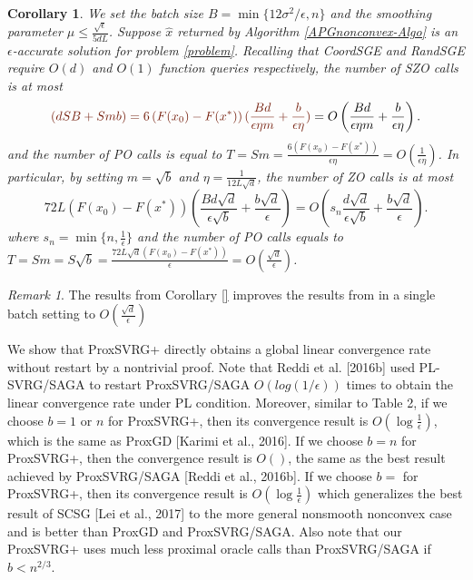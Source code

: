 \documentclass{article}
\newtheorem{corollary}[theorem]{Corollary}
\theoremstyle{definition}
\theoremstyle{remark}
\newtheorem{remark}[theorem]{Remark}
\begin{document}
\begin{corollary}\label{corr11-rand}
We set the batch size $B = \min\{12\sigma^2/\epsilon, n\}$ and the smoothing parameter $\mu \leq \frac{\sqrt{\epsilon}}{5{dL}}$. Suppose $\hat{x}$ returned by Algorithm \ref{APGnonconvex-Algo}  is an $\epsilon$-accurate solution for problem \eqref{problem}. Recalling that CoordSGE and RandSGE require $O(d)$ and $O(1)$ function queries respectively, the number of SZO calls is at most 
\begin{equation}\label{SZO-call-nocon-rand}
{\color{Brown}(dSB+Smb) = 6 \left(F(x_0) - F({x}^*)\right) (\frac{Bd}{\epsilon\eta m}+\frac{b}{\epsilon\eta})} = O\left(\frac{Bd}{\epsilon\eta m}+\frac{b}{\epsilon\eta}\right).
\end{equation} 
and the number of PO calls is equal to $T = Sm = \frac{6\left(F(x_0) - F({x}^*)\right)}{\epsilon\eta} = O\left(\frac{1}{\epsilon\eta}\right)$. In particular, by setting $m=\sqrt{b}$ and {\color{Brown}$\eta = \frac{1}{12L\sqrt{d}}$}, the number of ZO calls is at most 
\begin{equation}\label{SZO-call-par-nocon-rand}
72 L (F(x_0)-F(x^*))\left(\frac{Bd\sqrt{d}}{\epsilon\sqrt{b}}+\frac{b\sqrt{d}}{\epsilon}\right) = O\left(s_n\frac{d\sqrt{d}}{\epsilon \sqrt{b}}+\frac{b\sqrt{d}}{\epsilon}\right).
\end{equation}
where $s_n = \min\{n,\frac{1}{\epsilon}\}$ and the number of PO calls equals to $T = Sm = S\sqrt{b} = \frac{72 L \sqrt{d}\left(F(x_0) - F({x}^*)\right)}{\epsilon} = O\left(\frac{\sqrt{d}}{\epsilon}\right)$. 
\end{corollary}
\begin{remark}
The results from Corollary \ref{} improves the results from \cite{} in a single batch setting to $O(\frac{\sqrt{d}}{\epsilon})$
{\color{Violet}
We show that ProxSVRG+ directly obtains a global linear convergence rate without restart by a nontrivial proof. Note that Reddi et al. [2016b] used PL-SVRG/SAGA to restart ProxSVRG/SAGA $O(log(1/\epsilon))$ times to obtain
the linear convergence rate under PL condition.
Moreover, similar to Table 2, if we choose $b = 1$ or $n$ for ProxSVRG+, then its convergence result is $O(\log \frac{1}{\epsilon})$,
which is the same as ProxGD [Karimi et al., 2016]. If we choose $b = n$ for ProxSVRG+, then the convergence result is $O()$, the same as the best result achieved by ProxSVRG/SAGA [Reddi et al., 2016b]. If we
choose $b = $ for ProxSVRG+, then its convergence result is $O(\log\frac{1}{\epsilon})$
which generalizes the best result of SCSG [Lei et al., 2017] to the more general nonsmooth nonconvex case and is better than ProxGD and ProxSVRG/SAGA. Also note that our ProxSVRG+ uses much less proximal oracle calls than ProxSVRG/SAGA if $b < n ^{2/3}$.

}
\end{remark}
\end{document}
